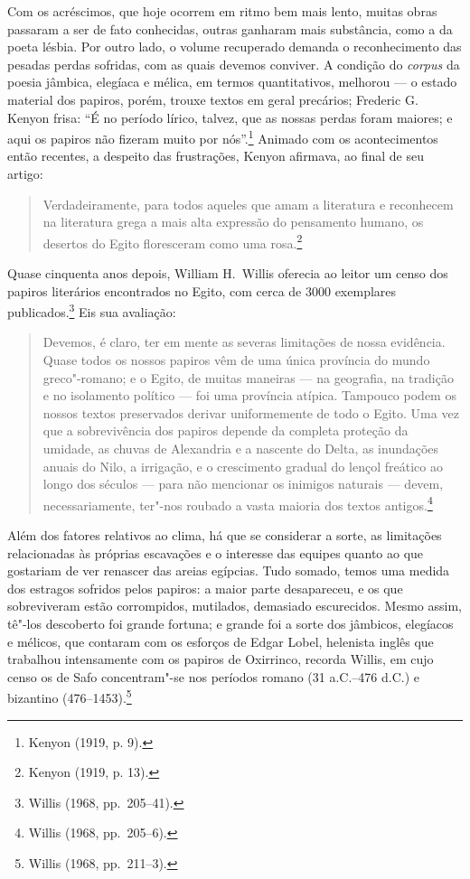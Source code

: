 Com os acréscimos, que hoje ocorrem em ritmo bem mais lento,
muitas obras passaram a ser de fato conhecidas, outras ganharam mais
substância, como a da poeta lésbia. Por outro lado, o volume recuperado demanda
o reconhecimento das pesadas perdas sofridas, com as quais devemos conviver. A
condição do \textit{corpus} da poesia jâmbica, elegíaca e mélica, em termos
quantitativos, melhorou --- o estado material dos papiros, porém, trouxe textos
em geral precários; Frederic G. Kenyon frisa:
“É no período lírico, talvez, que as nossas perdas foram maiores; e aqui os
papiros não fizeram muito por nós”.\footnote{ Kenyon (1919, p. 9).} Animado com os acontecimentos então
recentes, a despeito das frustrações, Kenyon afirmava, ao final de seu
artigo: 

\begin{quote}
Verdadeiramente, para todos aqueles que amam a literatura e reconhecem
na literatura grega a mais alta expressão do pensamento humano, os desertos do
Egito floresceram como uma rosa.\footnote{ Kenyon (1919, p. 13).}
\end{quote}


Quase cinquenta anos depois, William H.~Willis oferecia ao
leitor um censo dos papiros literários encontrados no Egito, com cerca de 3000
exemplares publicados.\footnote{ Willis (1968, pp.~205--41).} Eis sua avaliação: 

\begin{quote}
Devemos, é claro, ter em mente as severas limitações de nossa evidência. Quase
todos os nossos papiros vêm de uma única província do mundo greco"-romano; e o
Egito, de muitas maneiras --- na geografia, na tradição e no isolamento político
--- foi uma província atípica. Tampouco podem os nossos textos preservados
derivar uniformemente de todo o Egito. Uma vez que a sobrevivência dos papiros
depende da completa proteção da umidade, as chuvas de Alexandria e a nascente
do Delta, as inundações anuais do Nilo, a irrigação, e o crescimento gradual do
lençol freático ao longo dos séculos --- para não mencionar os inimigos naturais
--- devem, necessariamente, ter"-nos roubado a vasta maioria dos textos antigos.\footnote{ Willis (1968, pp.~205--6).}
\end{quote}

Além dos fatores relativos ao clima, há que se considerar a sorte, as limitações
relacionadas às próprias escavações e o interesse das equipes quanto ao que
gostariam de ver renascer das areias egípcias. Tudo somado, temos uma medida
dos estragos sofridos pelos papiros: a maior parte desapareceu, e os que
sobreviveram estão corrompidos, mutilados, demasiado escurecidos. Mesmo assim,
tê"-los descoberto foi grande fortuna; e grande foi a sorte dos jâmbicos,
elegíacos e mélicos, que contaram com os esforços de Edgar Lobel, helenista
inglês que trabalhou intensamente com os papiros de Oxirrinco, recorda Willis,
em cujo censo os de Safo concentram"-se nos períodos
romano (31 a.C.--476 d.C.) e bizantino (476--1453).\footnote{ Willis (1968, pp.~211--3).}


